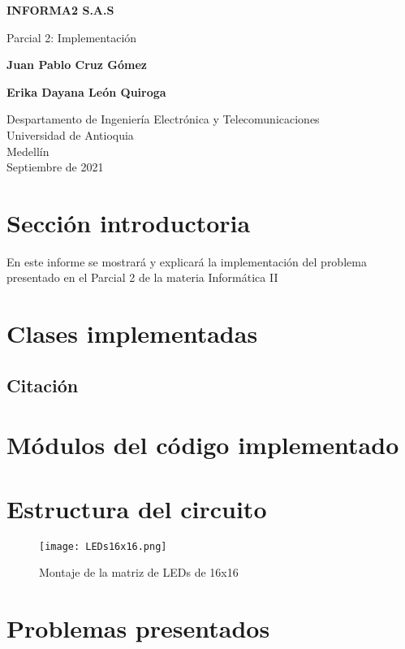 \documentclass{article}
\begin{document}
\begin{titlepage}
    \begin{center}
        \vspace*{1cm}
            
        \Huge
        \textbf{INFORMA2 S.A.S}
            
        \vspace{0.5cm}
        \LARGE
        Parcial 2: Implementación
            
        \vspace{5cm}
            
        \textbf{Juan Pablo Cruz Gómez}
        
        \vspace{0.5cm}
        
        \textbf{Erika Dayana León Quiroga}
            
        \vfill
            
        \vspace{0.8cm}
            
        \Large
        Despartamento de Ingeniería Electrónica y Telecomunicaciones\\
        Universidad de Antioquia\\
        Medellín\\
        Septiembre de 2021
            
    \end{center}
\end{titlepage}

\tableofcontents
\newpage
\section{Sección introductoria}\label{intro}
En este informe se mostrará y explicará la implementación del problema presentado en el Parcial 2 de la materia Informática II

\section{Clases implementadas} \label{clases}

\subsection{Citación}



\section{Módulos del código implementado} \label{Modulos}

\section{Estructura del circuito} \label{circuito}

\begin{figure}[h]
\texttt{[image: LEDs16x16.png]}
\centering
\caption{Montaje de la matriz de LEDs de 16x16}
\label{fig:punto1}
\end{figure}


\section{Problemas presentados} \label{problemas}
\end{document}
